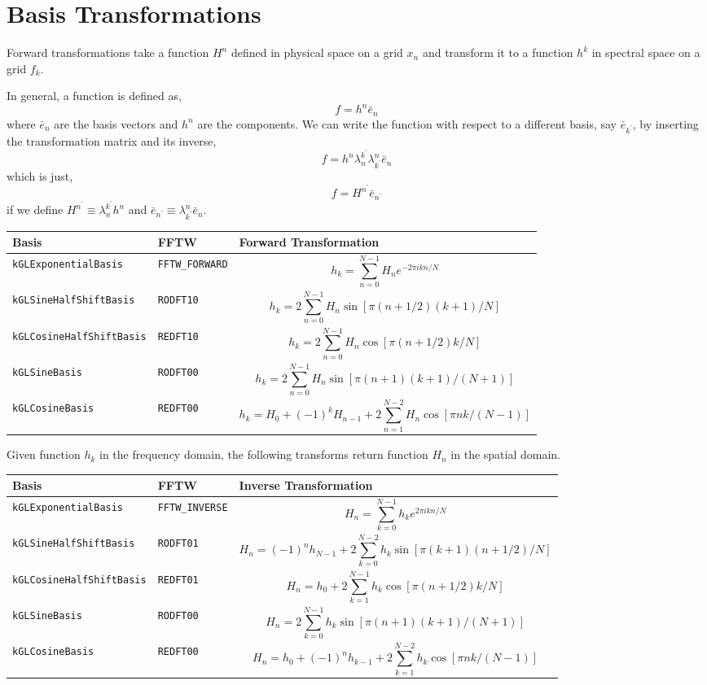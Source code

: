\documentclass[11pt]{article}
\begin{document}
\section{Basis Transformations}
Forward transformations take a function $H^n$ defined in physical space on a grid $x_n$ and transform it to a function $h^k$ in spectral space on a grid $f_k$.

In general, a function is defined as,
\begin{equation}
f = h^n \bar{e}_n
\end{equation}
where $\bar{e}_n$ are the basis vectors and $h^n$ are the components. We can write the function with respect to a different basis, say $\bar{e}_{k^\prime}$, by inserting the transformation matrix and its inverse,
\begin{equation}
f = h^n \lambda^{k^\prime}_n \lambda^n_{k^\prime} \bar{e}_n
\end{equation}
which is just,
\begin{equation}
f = H^{n^\prime} \bar{e}_{n^\prime}
\end{equation}
if we define $H^{n^\prime} \equiv \lambda^{k^\prime}_n h^n$ and $\bar{e}_{n^\prime} \equiv  \lambda^n_{k^\prime} \bar{e}_n$.

\begin{tabular}{llL}
      \hline
      Basis & FFTW & Forward Transformation \tabularnewline \hline \hline
      \verb"kGLExponentialBasis" & \verb"FFTW_FORWARD" & \[ h_k = \sum_{n=0}^{N-1} H_n e^{-2\pi i k n/N} \] \tabularnewline
      \verb"kGLSineHalfShiftBasis" & \verb"RODFT10" & \[ h_k = 2 \sum_{n=0}^{N-1} H_n \sin \left[ \pi(n+1/2)(k+1)/N\right] \] \tabularnewline
      \verb"kGLCosineHalfShiftBasis" & \verb"REDFT10" & \[ h_k = 2 \sum_{n=0}^{N-1} H_n \cos \left[ \pi (n+1/2)k/N\right] \] \tabularnewline
      \verb"kGLSineBasis" & \verb"RODFT00" & \[ h_k = 2 \sum_{n=0}^{N-1} H_n \sin \left[ \pi(n+1)(k+1)/(N+1)\right] \] \tabularnewline
      \verb"kGLCosineBasis" & \verb"REDFT00" & \[ h_k = H_{0} + (-1)^{k} H_{n-1} +  2 \sum_{n=1}^{N-2} H_n \cos \left[ \pi n k/(N-1)\right] \] \tabularnewline
      \hline
\end{tabular}

Given function $h_k$ in the frequency domain, the following transforms return function $H_n$ in the spatial domain.

\begin{tabular}{llL}
      \hline
      Basis & FFTW & Inverse Transformation \tabularnewline \hline \hline
      \verb"kGLExponentialBasis" & \verb"FFTW_INVERSE" & \[ H_n = \sum_{k=0}^{N-1} h_k e^{2\pi i k n/N} \] \tabularnewline
      \verb"kGLSineHalfShiftBasis" & \verb"RODFT01" & \[ H_n = (-1)^n h_{N-1} + 2 \sum_{k=0}^{N-2} h_k \sin \left[ \pi(k+1)(n+1/2)/N\right] \] \tabularnewline
      \verb"kGLCosineHalfShiftBasis" & \verb"REDFT01" & \[ H_n = h_{0} + 2 \sum_{k=1}^{N-1} h_k \cos \left[ \pi (n+1/2)k/N\right] \] \tabularnewline
            \verb"kGLSineBasis" & \verb"RODFT00" & \[ H_n = 2 \sum_{k=0}^{N-1} h_k \sin \left[ \pi(n+1)(k+1)/(N+1)\right] \] \tabularnewline
      \verb"kGLCosineBasis" & \verb"REDFT00" & \[ H_n = h_{0} + (-1)^{n} h_{k-1} +  2 \sum_{k=1}^{N-2} h_k \cos \left[ \pi n k/(N-1)\right] \] \tabularnewline
      \hline
\end{tabular}
\end{document}
